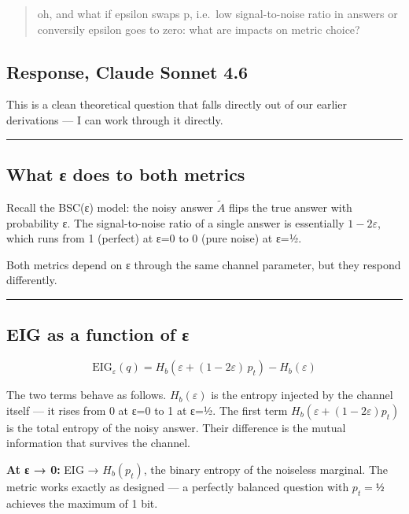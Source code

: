 \documentclass[
]{article}
\begin{document}
\begin{quote}
oh, and what if epsilon swaps p, i.e.~low signal-to-noise ratio in
answers or conversily epsilon goes to zero: what are impacts on metric
choice?
\end{quote}

\subsection{Response, Claude Sonnet
4.6}\label{response-claude-sonnet-4.6-6}

This is a clean theoretical question that falls directly out of our
earlier derivations --- I can work through it directly.

\begin{center}\rule{0.5\linewidth}{0.5pt}\end{center}

\subsection{What ε does to both
metrics}\label{what-ux3b5-does-to-both-metrics}

Recall the BSC(ε) model: the noisy answer \(\tilde{A}\) flips the true
answer with probability ε. The signal-to-noise ratio of a single answer
is essentially \(1 - 2\varepsilon\), which runs from 1 (perfect) at ε=0
to 0 (pure noise) at ε=½.

Both metrics depend on ε through the same channel parameter, but they
respond differently.

\begin{center}\rule{0.5\linewidth}{0.5pt}\end{center}

\subsection{EIG as a function of ε}\label{eig-as-a-function-of-ux3b5}

\[\mathrm{EIG}_\varepsilon(q) = H_b\!\left(\varepsilon + (1-2\varepsilon)\,p_t\right) - H_b(\varepsilon)\]

The two terms behave as follows. \(H_b(\varepsilon)\) is the entropy
injected by the channel itself --- it rises from 0 at ε=0 to 1 at ε=½.
The first term \(H_b(\varepsilon + (1-2\varepsilon)p_t)\) is the total
entropy of the noisy answer. Their difference is the mutual information
that survives the channel.

\textbf{At ε → 0:} EIG → \(H_b(p_t)\), the binary entropy of the
noiseless marginal. The metric works exactly as designed --- a perfectly
balanced question with \(p_t = ½\) achieves the maximum of 1 bit.
\end{document}
